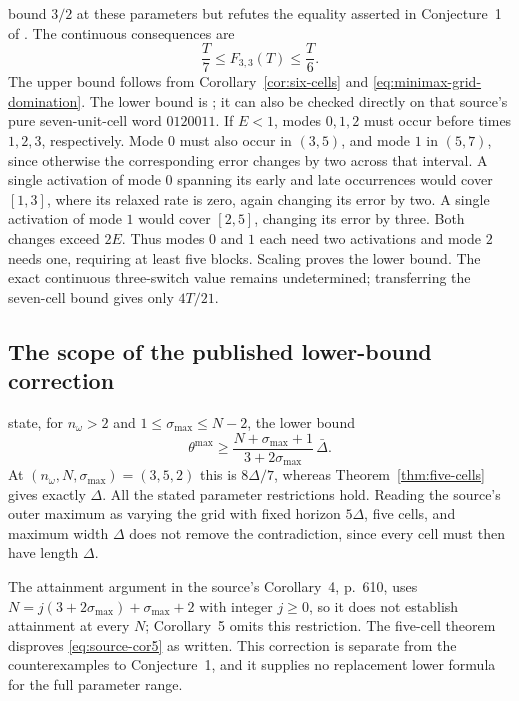 bound $3/2$ at these parameters but refutes the equality asserted in
Conjecture~1 of \citet[equation~(7.6), p.~615]{sager-zeile2021}.
The continuous consequences are
\begin{equation}\label{eq:three-three-band}
 \frac T7\le F_{3,3}(T)\le\frac T6.
\end{equation}
The upper bound follows from Corollary~\ref{cor:six-cells} and
\eqref{eq:minimax-grid-domination}. The lower bound is
\citet[Proposition~4, p.~612]{sager-zeile2021}; it can also be checked
directly on that source's pure seven-unit-cell word $0120011$.
If $E<1$, modes $0,1,2$ must occur before times $1,2,3$, respectively.
Mode $0$ must also occur in $(3,5)$, and mode $1$ in $(5,7)$, since
otherwise the corresponding error changes by two across that interval.
A single activation of mode $0$ spanning its early and late occurrences
would cover $[1,3]$, where its relaxed rate is zero, again changing
its error by two. A single activation of mode $1$ would cover $[2,5]$,
changing its error by three. Both changes exceed $2E$.
Thus modes $0$ and $1$ each need two activations and mode $2$ needs one,
requiring at least five blocks. Scaling proves the lower bound.
The exact continuous three-switch value remains undetermined;
transferring the seven-cell bound gives only $4T/21$.

\subsection{The scope of the published lower-bound correction}
\citet[Corollary~5, p.~611]{sager-zeile2021} state, for
$n_\omega>2$ and $1\le\sigma_{\max}\le N-2$, the lower bound
\begin{equation}\label{eq:source-cor5}
 \theta^{\max}\ge
 \frac{N+\sigma_{\max}+1}{3+2\sigma_{\max}}\,\bar\Delta.
\end{equation}
At $(n_\omega,N,\sigma_{\max})=(3,5,2)$ this is $8\Delta/7$,
whereas Theorem~\ref{thm:five-cells} gives exactly $\Delta$.
All the stated parameter restrictions hold. Reading the source's outer
maximum as varying the grid with fixed horizon $5\Delta$, five cells, and
maximum width $\Delta$ does not remove the contradiction, since every cell
must then have length $\Delta$.

The attainment argument in the source's Corollary~4, p.~610, uses
$N=j(3+2\sigma_{\max})+\sigma_{\max}+2$ with integer $j\ge0$, so it does
not establish attainment at every $N$; Corollary~5 omits this restriction.
The five-cell theorem disproves \eqref{eq:source-cor5} as written. This
correction is separate from the counterexamples to Conjecture~1, and it
supplies no replacement lower formula for the full parameter range.
